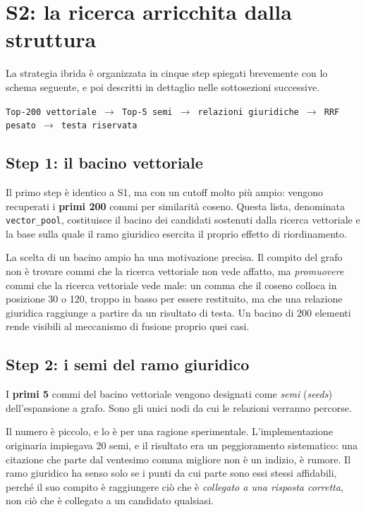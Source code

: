 \section{S2: la ricerca arricchita dalla struttura}

La strategia ibrida è organizzata in cinque step spiegati brevemente con lo schema seguente, e poi descritti in dettaglio nelle sottosezioni successive.

\begin{center}
\texttt{Top-200 vettoriale $\rightarrow$ Top-5 semi $\rightarrow$ relazioni giuridiche $\rightarrow$ RRF pesato $\rightarrow$ testa riservata}
\end{center}

\subsection{Step 1: il bacino vettoriale}

Il primo step è identico a S1, ma con un cutoff molto più ampio: vengono recuperati i \textbf{primi 200} commi per similarità coseno. Questa lista, denominata \texttt{vector\_pool}, costituisce il bacino dei candidati sostenuti dalla ricerca vettoriale e la base sulla quale il ramo giuridico esercita il proprio effetto di riordinamento.

La scelta di un bacino ampio ha una motivazione precisa. Il compito del grafo non è trovare commi che la ricerca vettoriale non vede affatto, ma \textit{promuovere} commi che la ricerca vettoriale vede male: un comma che il coseno colloca in posizione 30 o 120, troppo in basso per essere restituito, ma che una relazione giuridica raggiunge a partire da un risultato di testa. Un bacino di 200 elementi rende visibili al meccanismo di fusione proprio quei casi.

\subsection{Step 2: i semi del ramo giuridico}

I \textbf{primi 5} commi del bacino vettoriale vengono designati come \textit{semi} (\textit{seeds}) dell'espansione a grafo. Sono gli unici nodi da cui le relazioni verranno percorse.

Il numero è piccolo, e lo è per una ragione sperimentale. L'implementazione originaria impiegava 20 semi, e il risultato era un peggioramento sistematico: una citazione che parte dal ventesimo comma migliore non è un indizio, è rumore. Il ramo giuridico ha senso solo se i punti da cui parte sono essi stessi affidabili, perché il suo compito è raggiungere ciò che è \textit{collegato a una risposta corretta}, non ciò che è collegato a un candidato qualsiasi.

